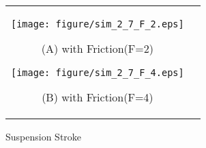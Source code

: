 \documentclass[a4paper,12pt]{article_vdlab_sotsuron}
\begin{document}
\vspace{10mm}
\begin{figure}[h]
    \begin{tabular}{cc}
      \begin{minipage}{0.45\hsize}
	\centering
	\vspace{20mm}
	  \texttt{[image: figure/sim\_2\_7\_F\_2.eps]}
	  \begin{center}
	  \vspace{2mm}
	  \ (A) with Friction(F=2)\
	  \end{center}
	\end{minipage}
       \begin{minipage}{0.5\hsize}
	\centering
	\vspace{20mm}
	  \texttt{[image: figure/sim\_2\_7\_F\_4.eps]}
	  \begin{center}
	  \vspace{2mm}
	  \ (B) with Friction(F=4)\
	  \end{center}
      \end{minipage}
    \end{tabular}
    \vspace{2mm}
    \caption{Suspension Stroke}
    \label{fig:sim_f_1}
\end{figure}



\newpage
\end{document}

